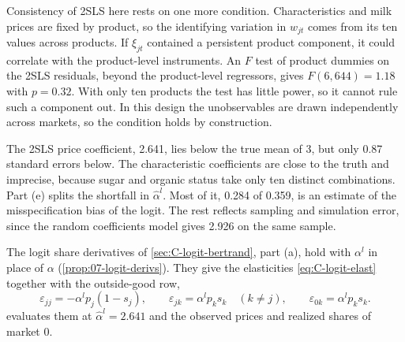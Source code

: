 Consistency of 2SLS here rests on one more condition. Characteristics and milk prices are fixed by product, so the
identifying variation in $w_{jt}$ comes from its ten values across products. If $\xi_{jt}$ contained a persistent
product component, it could correlate with the product-level instruments. An $F$ test of product dummies on the 2SLS
residuals, beyond the product-level regressors, gives $F(6, 644) = 1.18$ with $p = 0.32$. With only ten products the test
has little power, so it cannot rule such a component out. In this design the unobservables are drawn independently
across markets, so the condition holds by construction.

The 2SLS price coefficient, 2.641, lies below the true mean of 3, but only 0.87 standard errors below. The
characteristic coefficients are close to the truth and imprecise, because sugar and organic status take only ten distinct
combinations. Part (e) splits the shortfall in $\hat\alpha^l$. Most of it, 0.284 of 0.359, is an estimate of the
misspecification bias of the logit. The rest reflects sampling and simulation error, since the random coefficients model
gives 2.926 on the same sample.

The logit share derivatives of \cref{sec:C-logit-bertrand}, part (a), hold with $\alpha^l$ in place of $\alpha$
(\cref{prop:07-logit-derivs}). They give the elasticities \eqref{eq:C-logit-elast} together with the outside-good row,
\begin{equation}\label{eq:C-lelast}
  \varepsilon_{jj} = -\alpha^l p_j(1 - s_j), \qquad \varepsilon_{jk} = \alpha^l p_ks_k \quad (k \ne j), \qquad
  \varepsilon_{0k} = \alpha^l p_ks_k .
\end{equation}
 evaluates them at $\hat\alpha^l = 2.641$ and the observed prices and realized shares of market 0.

